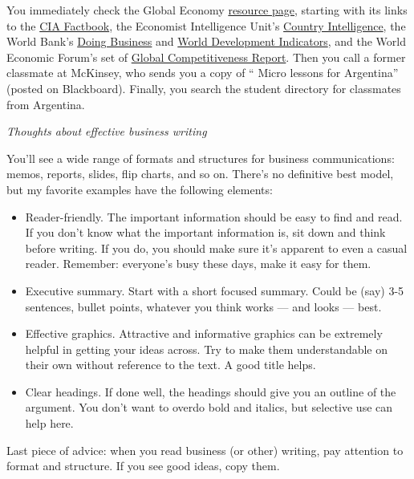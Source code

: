 \documentclass[letterpaper,12pt]{article}
\begin{document}
You immediately check the Global Economy 
\href{http://www.stern.nyu.edu/eco/b012303/Backus/ge_resources_db.htm}
{resource page},
starting with its links to the 
\href{http://www.cia.gov/cia/publications/factbook/}{CIA Factbook}, 
the Economist Intelligence Unit's 
\href{http://db.eiu.com/index.asp?layout=AllTitles}{Country Intelligence},
the World Bank's 
\href{http://www.doingbusiness.org/}
{Doing Business} 
and 
\href{http://devdata.worldbank.org/dataonline/}
{World Development Indicators}, 
and the World Economic Forum's set of 
\href{http://www.weforum.org/en/index.htm}
{Global Competitiveness Report}.
Then you call a former classmate at McKinsey,
who sends you a copy of 
``%
{Micro lessons for Argentina}'' (posted on Blackboard).  
Finally, you search the student directory for classmates from Argentina.


\newpage
{\it Thoughts about effective business writing}

You'll see a wide range of formats and structures 
for business communications:
memos, reports, slides, flip charts, and so on.
There's no definitive best model,
but my favorite examples have the following elements:  
%
\begin{itemize}
\item Reader-friendly.  
The important information should be easy to find and read.  
If you don't know what the important information is, 
sit down and think before writing. 
If you do, you should make sure it's apparent to even a casual reader.
Remember:  everyone's busy these days, make it easy for them.  

\item Executive summary.  Start with a short focused summary.  Could be (say) 3-5 sentences, bullet points, whatever you think works 
     --- and looks --- best.  
    
\item Effective graphics.  Attractive and informative graphics 
can be extremely helpful in getting your ideas across.
Try to make them understandable
on their own without reference to the text.  A good title helps.  

\item Clear headings.  If done well, the headings should 
give you an outline of the argument.  
You don't want to overdo bold and italics, 
but selective use can help here.  

\end{itemize}
%
Last piece of advice:  when you read business (or other) writing, 
pay attention to format and structure.  
If you see good ideas, copy them.  
\end{document}
